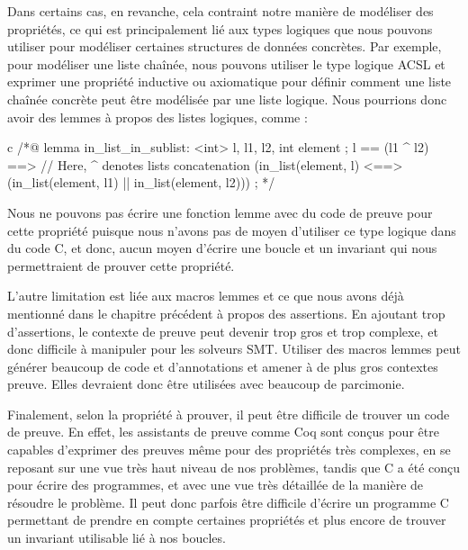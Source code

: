 Dans certains cas, en revanche, cela contraint notre manière de modéliser des
propriétés, ce qui est principalement lié aux types logiques que nous pouvons
utiliser pour modéliser certaines structures de données concrètes. Par exemple,
pour modéliser une liste chaînée, nous pouvons utiliser le type logique ACSL
 et exprimer une propriété inductive ou
axiomatique pour définir comment une liste chaînée concrète peut être modélisée
par une liste logique. Nous pourrions donc avoir des lemmes à propos des listes
logiques, comme :

\begin{CodeBlock}{c}
/*@
  lemma in_list_in_sublist:
    \forall \list<int> l, l1, l2, int element ;
      l == (l1 ^ l2) ==>      // Here, ^ denotes lists concatenation
      (in_list(element, l) <==> (in_list(element, l1) || in_list(element, l2))) ;
*/
\end{CodeBlock}


Nous ne pouvons pas écrire une fonction lemme avec du code de preuve
pour cette propriété puisque nous n'avons pas de moyen d'utiliser ce type logique
dans du code C, et donc, aucun moyen d'écrire une boucle et un invariant qui nous 
permettraient de prouver cette propriété.


L'autre limitation est liée aux macros lemmes et ce que nous avons déjà
mentionné dans le chapitre précédent à propos des assertions. En ajoutant trop
d'assertions, le contexte de preuve peut devenir trop gros et trop complexe, et
donc difficile à manipuler pour les solveurs SMT. Utiliser des
macros lemmes peut générer beaucoup de code et d'annotations et amener
à de plus gros contextes preuve. Elles devraient
donc être utilisées avec beaucoup de parcimonie.


Finalement, selon la propriété à prouver, il peut être difficile de trouver un
code de preuve. En effet, les assistants de preuve comme Coq sont conçus pour
être capables d'exprimer des preuves même pour des propriétés très complexes,
en se reposant sur une vue très haut niveau de nos problèmes, tandis que C a été
conçu pour écrire des programmes, et avec une vue très détaillée de la manière de
résoudre le problème. Il peut donc parfois être difficile d'écrire un programme
C permettant de prendre en compte certaines propriétés et plus encore de trouver
un invariant utilisable lié à nos boucles.




